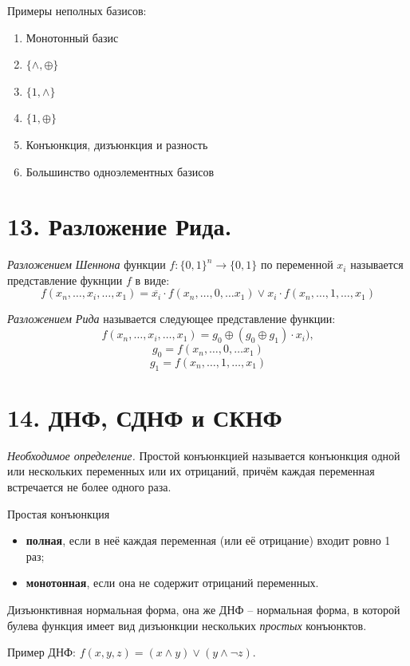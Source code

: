 Примеры неполных базисов:

\begin{enumerate}
	\item Монотонный базис
	\item $\{\wedge,\oplus\}$
	\item $\{1,\wedge\}$
	\item $\{1,\oplus\}$
	\item Конъюнкция, дизъюнкция и разность
	\item Большинство одноэлементных базисов
\end{enumerate}

\section*{13.  Разложение Рида.}
\textit{Разложением Шеннона} функции $f: \{0, 1\}^n \rightarrow \{0, 1\}$ по переменной $x_i$ называется представление фукнции $f$ в виде:
\[
f(x_n, \ldots, x_i, \ldots, x_1) = \overline {x_i} \cdot f(x_n, \ldots, 0, \ldots x_1) \lor x_i \cdot f(x_n, \ldots, 1, \ldots, x_1)
\]

\textit{Разложением Рида} называется следующее представление функции:
\[
f(x_n, \ldots, x_i, \ldots, x_1) = g_0 \oplus (g_0 \oplus g_1) \cdot x_i),
\]
\[
g_0 = f(x_n, \ldots, 0, \ldots x_1)
\]
\[
g_1 = f(x_n, \ldots, 1, \ldots, x_1)
\]

\section*{14. ДНФ, СДНФ и СКНФ}

 \textit {Необходимое определение.} Простой конъюнкцией называется конъюнкция одной или нескольких переменных или их отрицаний, причём каждая переменная встречается не более одного раза.
 
 Простая конъюнкция
 \begin{itemize}
 	\item \textbf{полная}, если в неё каждая переменная (или её отрицание) входит ровно 1 раз;
 	\item \textbf{монотонная}, если она не содержит отрицаний переменных.
 \end{itemize}
 
 Дизъюнктивная нормальная форма, она же ДНФ -- нормальная форма, в которой булева функция имеет вид дизъюнкции нескольких \textit{простых} конъюнктов.
 
 Пример ДНФ: $f(x,y,z) = (x \land y) \lor (y \land \neg {z})$.
 
